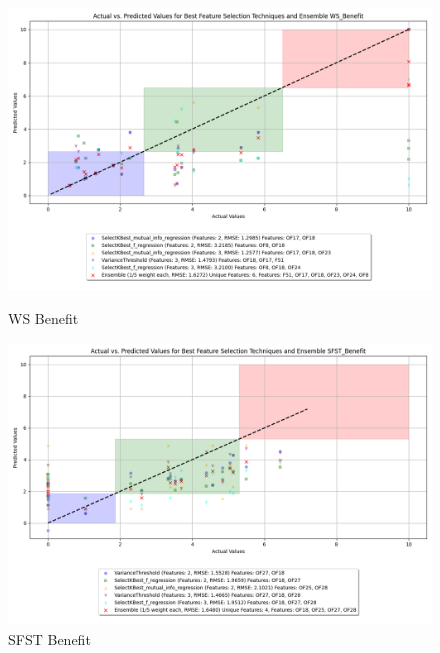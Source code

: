 \begin{figure}[H]
    \centering
    \begin{minipage}{0.45\textwidth}
        \centering
        \includegraphics[width=\linewidth]{reg_section_specific/images_reg_featred_ensemble/actual_vs_predicted_smallest_feature_selection_and_ensemble_WS_Benefit.png}
        \caption{WS Benefit}
        \label{fig_reg_spec:ws_ben_reg_featred_smallest_ensemble}
    \end{minipage}\hfill
    \begin{minipage}{0.45\textwidth}
        \centering
        \includegraphics[width=\linewidth]{reg_section_specific/images_reg_featred_ensemble/actual_vs_predicted_smallest_feature_selection_and_ensemble_SFST_Benefit.png}
        \caption{SFST Benefit}
        \label{fig_reg_spec:sfst_ben_reg_featred_smallest_ensemble}
    \end{minipage}
\end{figure}